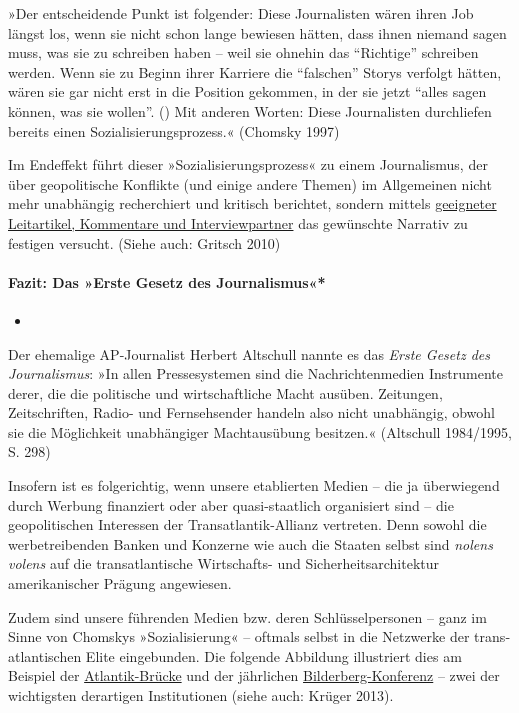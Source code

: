 »Der entscheidende Punkt ist folgender: Diese Journalisten wären ihren
Job längst los, wenn sie nicht schon lange bewiesen hätten, dass ihnen
niemand sagen muss, was sie zu schreiben haben -- weil sie ohnehin das
``Richtige'' schreiben werden. Wenn sie zu Beginn ihrer Karriere die
``falschen'' Storys verfolgt hätten, wären sie gar nicht erst in die
Position gekommen, in der sie jetzt ``alles sagen können, was sie
wollen''. () Mit anderen Worten: Diese Journalisten durchliefen bereits
einen Sozialisierungsprozess.« (Chomsky 1997)

Im Endeffekt führt dieser »Sozialisierungsprozess« zu einem
Journalismus, der über geopolitische Konflikte (und einige andere
Themen) im Allgemeinen nicht mehr unabhängig recherchiert und kritisch
berichtet, sondern mittels
\href{https://swprs.org/die-nzz-studie/}{geeigneter Leitartikel,
Kommentare und Interviewpartner} das gewünschte Narrativ zu festigen
versucht. (Siehe auch: Gritsch 2010)

\hypertarget{fazit-das-erste-gesetz-des-journalismus}{%
\paragraph{Fazit: Das »Erste Gesetz des
Journalismus«*}\label{fazit-das-erste-gesetz-des-journalismus}}

\begin{itemize}
\item
\end{itemize}

Der ehemalige AP-Journalist Herbert Altschull nannte es das \emph{Erste
Gesetz des Journalismus}: »In allen Pressesystemen sind die
Nachrichtenmedien Instru­mente derer, die die politische und
wirtschaftliche Macht ausüben. Zeitungen, Zeitschriften, Radio- und
Fernsehsender handeln also nicht unabhängig, obwohl sie die Möglichkeit
unabhängiger Machtausübung besitzen.« (Altschull 1984/1995, S. 298)

Insofern ist es folgerichtig, wenn unsere etablierten Medien -- die ja
überwiegend durch Werbung finanziert oder aber quasi-staatlich
organisiert sind -- die geopolitischen Interessen der
Transatlantik-Allianz vertreten. Denn sowohl die werbetreibenden Banken
und Konzerne wie auch die Staaten selbst sind \emph{nolens volens} auf
die transatlantische Wirtschafts- und Sicherheitsarchitektur
amerikanischer Prägung angewiesen.

Zudem sind unsere führenden Medien bzw. deren Schlüsselpersonen -- ganz
im Sinne von Chomskys »Sozialisierung« -- oftmals selbst in die
Netzwerke der trans­atlantischen Elite eingebunden. Die folgende
Abbildung illustriert dies am Beispiel der
\href{https://de.wikipedia.org/wiki/Atlantik-Br\%C3\%BCcke}{Atlantik-Brücke}
und der jährlichen
\href{https://de.wikipedia.org/wiki/Bilderberg-Konferenz}{Bilderberg-Konferenz}
-- zwei der wichtigsten derartigen Institutionen (siehe auch: Krüger
2013).

